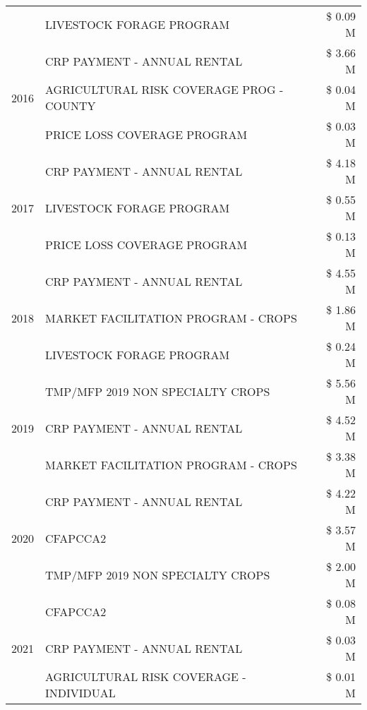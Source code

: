\begin{tabular}{llr}
 & LIVESTOCK FORAGE PROGRAM & \$ 0.09 M \\
\cline{1-3}
\multirow[t]{3}{*}{2016} & CRP PAYMENT - ANNUAL RENTAL & \$ 3.66 M \\
 & AGRICULTURAL RISK COVERAGE PROG - COUNTY & \$ 0.04 M \\
 & PRICE LOSS COVERAGE PROGRAM & \$ 0.03 M \\
\cline{1-3}
\multirow[t]{3}{*}{2017} & CRP PAYMENT - ANNUAL RENTAL & \$ 4.18 M \\
 & LIVESTOCK FORAGE PROGRAM & \$ 0.55 M \\
 & PRICE LOSS COVERAGE PROGRAM & \$ 0.13 M \\
\cline{1-3}
\multirow[t]{3}{*}{2018} & CRP PAYMENT - ANNUAL RENTAL & \$ 4.55 M \\
 & MARKET FACILITATION PROGRAM - CROPS & \$ 1.86 M \\
 & LIVESTOCK FORAGE PROGRAM & \$ 0.24 M \\
\cline{1-3}
\multirow[t]{3}{*}{2019} & TMP/MFP 2019 NON SPECIALTY CROPS & \$ 5.56 M \\
 & CRP PAYMENT - ANNUAL RENTAL & \$ 4.52 M \\
 & MARKET FACILITATION PROGRAM - CROPS & \$ 3.38 M \\
\cline{1-3}
\multirow[t]{3}{*}{2020} & CRP PAYMENT - ANNUAL RENTAL & \$ 4.22 M \\
 & CFAPCCA2 & \$ 3.57 M \\
 & TMP/MFP 2019 NON SPECIALTY CROPS & \$ 2.00 M \\
\cline{1-3}
\multirow[t]{3}{*}{2021} & CFAPCCA2 & \$ 0.08 M \\
 & CRP PAYMENT - ANNUAL RENTAL & \$ 0.03 M \\
 & AGRICULTURAL RISK COVERAGE - INDIVIDUAL & \$ 0.01 M \\
\cline{1-3}
\bottomrule
\end{tabular}
